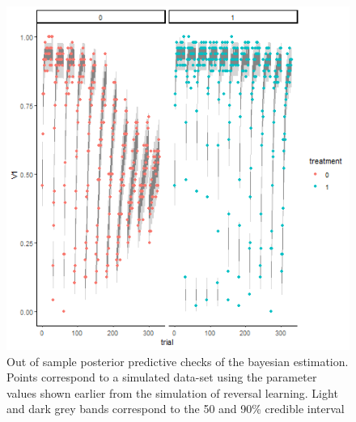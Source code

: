 \documentclass[
]{article}
\begin{document}
\begin{figure}

\includegraphics{sim_reversal_ppchecks} \hfill{}

\caption{Out of sample posterior predictive checks of the bayesian estimation. Points correspond to a simulated data-set using the parameter values shown earlier from the simulation of reversal learning. Light and dark grey bands correspond to the 50 and 90\% credible interval}\label{fig:ppcheck_rev_sim}
\end{figure}
\end{document}
